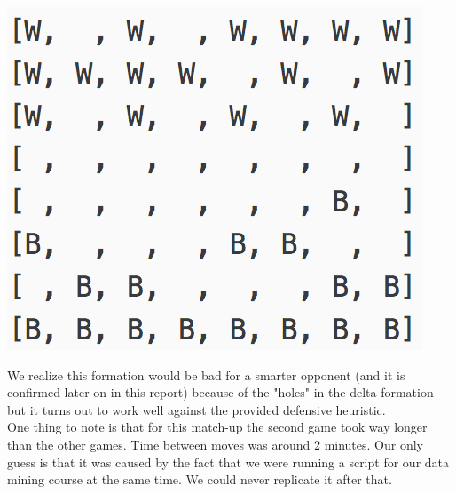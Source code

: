 \documentclass[11pt]{article}
\begin{document}
\begin{center}
\includegraphics[scale=1]{part2/ab-d2-vs-ab-o1-pattern.png}
\end{center}
We realize this formation would be bad for a smarter opponent (and it is confirmed later on in this report) because of the "holes" in the delta formation but it turns out to work well against the provided defensive heuristic.\\

One thing to note is that for this match-up the second game took way longer than the other games. Time between moves was around 2 minutes. Our only guess is that it was caused by the fact that we were running a script for our data mining course at the same time. We could never replicate it after that.\\
\end{document}
